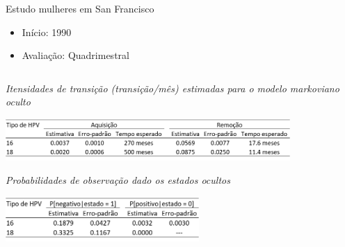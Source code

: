 \documentclass[ignorenonframetext,]{beamer}
\begin{document}
\begin{frame}

\begin{columns}
 \begin{column}{.4\textwidth}

  \begin{block}{Estudo}
   mulheres em San Francisco
  \pause
   \begin{itemize}
    \item Início: 1990
    \item Avaliação: Quadrimestral
   \end{itemize}
  \end{block}
 
 \end{column}
\end{columns}

\end{frame}

\begin{frame}

\textit{Itensidades de transição (transição/mês) estimadas para o 
        modelo markoviano oculto}

\includegraphics*[height = 1.6cm]{iBagens/t3.png}

\vspace{.5cm}

\pause
\textit{Probabilidades de observação dado os estados ocultos}

\centering \includegraphics*[height = 1.7cm]{iBagens/t4.png}

\end{frame}
\end{document}
